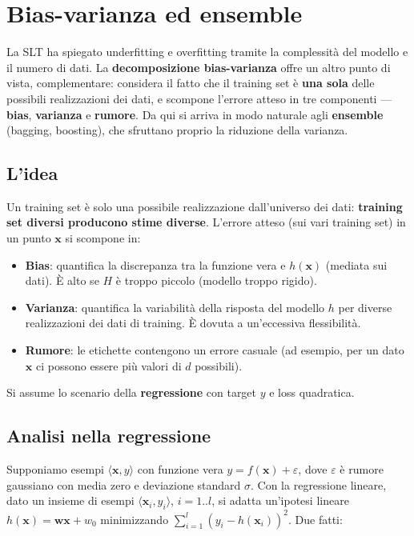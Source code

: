 \chapter{Bias-varianza ed ensemble}\label{ch-15}

La SLT ha spiegato underfitting e overfitting tramite la complessità del
modello e il numero di dati. La \textbf{decomposizione bias-varianza}
offre un altro punto di vista, complementare: considera il fatto che il
training set è \textbf{una sola} delle possibili realizzazioni dei dati,
e scompone l'errore atteso in tre componenti --- \textbf{bias},
\textbf{varianza} e \textbf{rumore}. Da qui si arriva in modo naturale
agli \textbf{ensemble} (bagging, boosting), che sfruttano proprio la
riduzione della varianza.

\section{L'idea}\label{lidea}

Un training set è solo una possibile realizzazione dall'universo dei
dati: \textbf{training set diversi producono stime diverse}. L'errore
atteso (sui vari training set) in un punto \(\mathbf{x}\) si scompone
in:

\begin{itemize}
\tightlist
\item
  \textbf{Bias}: quantifica la discrepanza tra la funzione vera e
  \(h(\mathbf{x})\) (mediata sui dati). È alto se \(H\) è troppo piccolo
  (modello troppo rigido).
\item
  \textbf{Varianza}: quantifica la variabilità della risposta del
  modello \(h\) per diverse realizzazioni dei dati di training. È dovuta
  a un'eccessiva flessibilità.
\item
  \textbf{Rumore}: le etichette contengono un errore casuale (ad
  esempio, per un dato \(\mathbf{x}\) ci possono essere più valori di
  \(d\) possibili).
\end{itemize}

Si assume lo scenario della \textbf{regressione} con target \(y\) e loss
quadratica.

\section{Analisi nella regressione}\label{analisi-nella-regressione}

Supponiamo esempi \(\langle \mathbf{x}, y\rangle\) con funzione vera
\(y = f(\mathbf{x}) + \varepsilon\), dove \(\varepsilon\) è rumore
gaussiano con media zero e deviazione standard \(\sigma\). Con la
regressione lineare, dato un insieme di esempi
\(\langle\mathbf{x}_i, y_i\rangle\), \(i = 1..l\), si adatta un'ipotesi
lineare \(h(\mathbf{x}) = \mathbf{w}\mathbf{x} + w_0\) minimizzando
\(\sum_{i=1}^l (y_i - h(\mathbf{x}_i))^2\). Due fatti:

